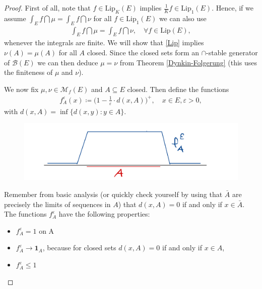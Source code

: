 \begin{proof}[Proof]
	First of all, note that $f\in \text{Lip}_K(E)$ implies $\frac{1}{K} f \in \text{Lip}_1(E)$. Hence, if we assume $\int_E f\dint \mu=\int_E f\dint \nu$ for all $f\in \text{Lip}_1(E)$ we can also use 
	\begin{align}\label{Lip}
			\int_E f\dint \mu = \int_E f\dint \nu,\quad \forall f \in \text{Lip}(E),
	\end{align}
	whenever the integrals are finite. We will show that \eqref{Lip} implies $\nu(A)=\mu(A)$ for all $A$ closed. Since the closed sets form an $\cap$-stable generator of $\mathcal B(E)$ we can then deduce $\mu=\nu$ from Theorem \ref{Dynkin-Folgerung} (this uses the finiteness of $\mu$ and $\nu$).\smallskip
	
	We now fix $\mu, \nu\in \mathcal M_f(E)$ and $A\subseteq E$ closed. Then define the functions
	\begin{align*}
		f_A^{\varepsilon}(x) \coloneqq \Big( 1 - \frac{1}{\varepsilon} \cdot d(x,A) \Big)^+,\quad x\in E, \varepsilon>0,
	\end{align*}
	with $d(x,A)=\inf\{d(x,y):y\in A\}$. 
			\begin{figure}[h]
			\begin{center}
				\includegraphics[scale=0.07]{f.jpeg}
			\end{center}
			\vspace{-9mm}
			\end{figure}	
	Remember from basic analysis (or quickly check yourself by using that $\bar A$ are precisely the limits of sequences in $A$) that $d(x,A)=0$ if and only if $x\in \bar A$. The functions $f_A^\varepsilon$ have the following properties:	
			\begin{itemize}
				\item $f_A^{\varepsilon} = 1$ on A
				\item $f_A^{\varepsilon} \to \mathbf 1_A$, because for closed sets $d(x,A)=0$ if and only if $x\in A$,
				\item $f_A^{\varepsilon} \leq 1$
			\end{itemize}

\end{proof}
